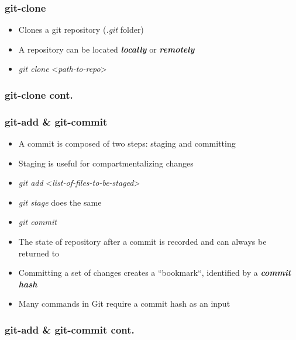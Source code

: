 \documentclass{beamer}
\begin{document}
\begin{frame}
  \frametitle{git-clone}
  \begin{itemize}
  \item<1-> Clones a git repository (\textit{.git} folder)
  \item<2-> A repository can be located \textit{\textbf{locally}} or \textit{\textbf{remotely}}
  \item<3->[] \textit{git clone} {\textless}\textit{path-to-repo}{\textgreater}
  \end{itemize}
\end{frame}

\begin{frame}
  \frametitle{git-clone cont.}
  {\centering
  }
\end{frame}

\begin{frame}
  \frametitle{git-add \& git-commit}
  \begin{itemize}
  \item<1-> A commit is composed of two steps: staging and committing
  \item<2-> Staging is useful for compartmentalizing changes
  \item<3->[] \textit{git add} {\textless}\textit{list-of-files-to-be-staged}{\textgreater}
  \item<3->[] \textit{git stage} does the same
  \item<3->[] \textit{git commit}
  \item<4-> The state of repository after a commit is recorded and can always be returned to
  \item<5-> Committing a set of changes creates a ``bookmark``, identified by a \textit{\textbf{commit hash}}
  \item<6-> Many commands in Git require a commit hash as an input
  \end{itemize}
\end{frame}

\begin{frame}
  \frametitle{git-add \& git-commit cont.}
  {\centering
  }
\end{frame}
\end{document}
